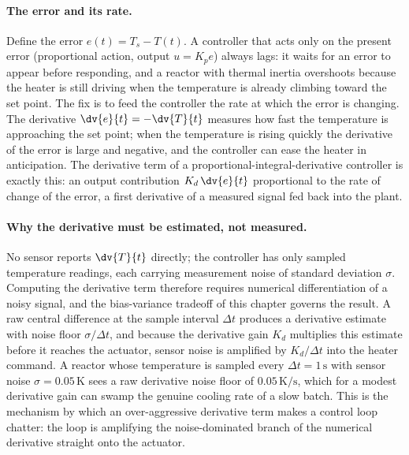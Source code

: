\paragraph{The error and its rate.}
Define the error $e(t) = T_{s} - T(t)$. A controller that acts only on
the present error (proportional action, output $u = K_{p} e$) always
lags: it waits for an error to appear before responding, and a reactor
with thermal inertia overshoots because the heater is still driving
when the temperature is already climbing toward the set point. The fix
is to feed the controller the rate at which the error is changing. The
derivative $\dv{e}{t} = -\dv{T}{t}$ measures how fast the temperature
is approaching the set point; when the temperature is rising quickly
the derivative of the error is large and negative, and the controller
can ease the heater in anticipation. The derivative term of a
proportional-integral-derivative controller is exactly this: an output
contribution $K_{d}\,\dv{e}{t}$ proportional to the rate of change of
the error, a first derivative of a measured signal fed back into the
plant.

\paragraph{Why the derivative must be estimated, not measured.}
No sensor reports $\dv{T}{t}$ directly; the controller has only sampled
temperature readings, each carrying measurement noise of standard
deviation $\sigma$. Computing the derivative term therefore requires
numerical differentiation of a noisy signal, and the bias-variance
tradeoff of this chapter governs the result. A raw central difference
at the sample interval $\Delta t$ produces a derivative estimate with
noise floor $\sigma/\Delta t$, and because the derivative gain
$K_{d}$ multiplies this estimate before it reaches the actuator, sensor
noise is amplified by $K_{d}/\Delta t$ into the heater command. A
reactor whose temperature is sampled every $\Delta t = 1\,\si{\second}$
with sensor noise $\sigma = 0.05\,\si{\kelvin}$ sees a raw
derivative noise floor of $0.05\,\si{\kelvin\per\second}$, which for a
modest derivative gain can swamp the genuine cooling rate of a slow
batch. This is the mechanism by which an over-aggressive derivative
term makes a control loop chatter: the loop is amplifying the
noise-dominated branch of the numerical derivative straight onto the
actuator.

